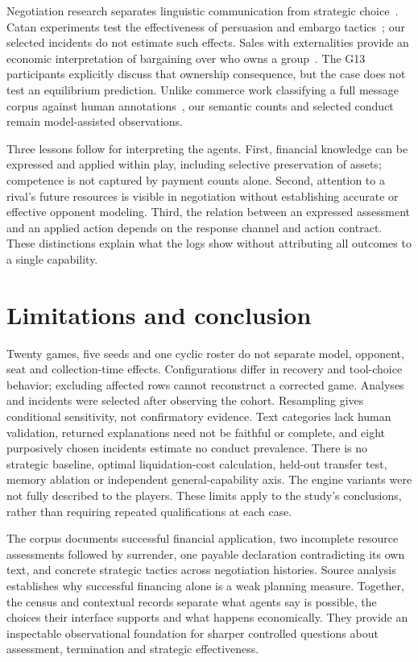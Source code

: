 Negotiation research separates linguistic communication from strategic choice~\cite{lewis2017deal,he2018decoupling,bianchi2024negotiationarena}. Catan experiments test the effectiveness of persuasion and embargo tactics~\cite{guhe2014persuasion}; our selected incidents do not estimate such effects. Sales with externalities provide an economic interpretation of bargaining over who owns a group~\cite{jehiel1996externalities}. The G13 participants explicitly discuss that ownership consequence, but the case does not test an equilibrium prediction. Unlike commerce work classifying a full message corpus against human annotations~\cite{li2026arena}, our semantic counts and selected conduct remain model-assisted observations.

Three lessons follow for interpreting the agents. First, financial knowledge can be expressed and applied within play, including selective preservation of assets; competence is not captured by payment counts alone. Second, attention to a rival's future resources is visible in negotiation without establishing accurate or effective opponent modeling. Third, the relation between an expressed assessment and an applied action depends on the response channel and action contract. These distinctions explain what the logs show without attributing all outcomes to a single capability.

\section{Limitations and conclusion}
Twenty games, five seeds and one cyclic roster do not separate model, opponent, seat and collection-time effects. Configurations differ in recovery and tool-choice behavior; excluding affected rows cannot reconstruct a corrected game. Analyses and incidents were selected after observing the cohort. Resampling gives conditional sensitivity, not confirmatory evidence. Text categories lack human validation, returned explanations need not be faithful or complete, and eight purposively chosen incidents estimate no conduct prevalence. There is no strategic baseline, optimal liquidation-cost calculation, held-out transfer test, memory ablation or independent general-capability axis. The engine variants were not fully described to the players. These limits apply to the study's conclusions, rather than requiring repeated qualifications at each case.

The corpus documents successful financial application, two incomplete resource assessments followed by surrender, one payable declaration contradicting its own text, and concrete strategic tactics across negotiation histories. Source analysis establishes why successful financing alone is a weak planning measure. Together, the census and contextual records separate what agents say is possible, the choices their interface supports and what happens economically. They provide an inspectable observational foundation for sharper controlled questions about assessment, termination and strategic effectiveness.

